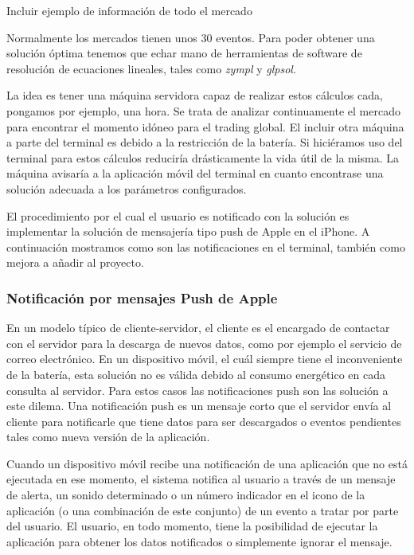     Incluir ejemplo de información de todo el mercado
    
  
 Normalmente los mercados tienen unos 30 eventos. Para poder obtener una solución óptima tenemos que echar mano de herramientas de software de resolución de ecuaciones lineales, tales como \emph{zympl} y \emph{glpsol}. 
  
  
  
   La idea es tener una máquina servidora capaz de realizar estos cálculos cada, pongamos por ejemplo, una hora. Se trata de analizar continuamente el mercado para encontrar el momento idóneo para el trading global. El incluir otra máquina a parte del terminal es debido a la restricción de la batería. Si hiciéramos uso del terminal para estos cálculos reduciría drásticamente la vida útil de la misma. La máquina avisaría a la aplicación móvil del terminal en cuanto encontrase una solución adecuada a los parámetros configurados. 
   
    El procedimiento por el cual el usuario es notificado con la solución es implementar la solución de mensajería tipo push de Apple en el iPhone. A continuación mostramos como son las notificaciones en el terminal, también como mejora a añadir al proyecto.
    
 \subsubsection{Notificación por mensajes Push de Apple}
   
   En un modelo típico de cliente-servidor, el cliente es el encargado de contactar con el servidor para la descarga de nuevos datos, como por ejemplo el servicio de correo electrónico. En un dispositivo móvil, el cuál siempre tiene el inconveniente de la batería, esta solución no es válida debido al consumo energético en cada consulta al servidor. Para estos casos las notificaciones push son las solución a este dilema. Una notificación push es un mensaje corto que el servidor envía al cliente para notificarle que tiene datos para ser descargados o eventos pendientes tales como nueva versión de la aplicación. 
   
    Cuando un dispositivo móvil recibe una notificación de una aplicación que no está ejecutada en ese momento, el sistema notifica al usuario a través de un mensaje de alerta, un sonido determinado o un número indicador en el icono de la aplicación (o una combinación de este conjunto) de un evento a tratar por parte del usuario. El usuario, en todo momento, tiene la posibilidad de ejecutar la aplicación para obtener los datos notificados o simplemente ignorar el mensaje.

